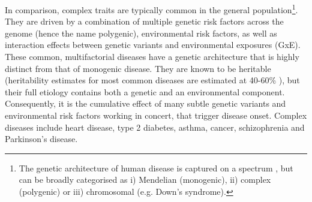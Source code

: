 

In comparison, complex traits are typically common in the general population\footnote{The genetic architecture of human disease is captured on a spectrum \cite{manolio2009finding}, but can be broadly categorised as i) Mendelian (monogenic), ii) complex (polygenic) or iii) chromosomal (e.g. Down's syndrome).}.
They are driven by a combination of multiple genetic risk factors across the genome (hence the name polygenic), environmental risk factors, as well as interaction effects between genetic variants and environmental exposures (GxE).
These common, multifactorial diseases have a genetic architecture that is highly distinct from that of monogenic disease. 
They are known to be heritable (heritability estimates for most common diseases are estimated at 40-60\% \cite{manolio2009finding, prokopenko2009variants, kathiresan2008six, zeggini2008meta, harley2008genome}), but their full etiology contains both a genetic and an environmental component.
Consequently, it is the cumulative effect of many subtle genetic variants and environmental risk factors working in concert, that trigger disease onset.
Complex diseases include heart disease, type 2 diabetes, asthma, cancer, schizophrenia and Parkinson's disease.\\

